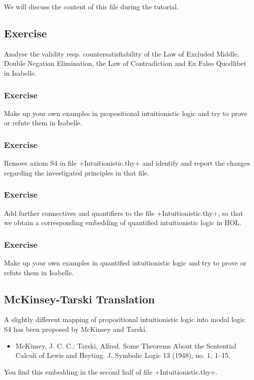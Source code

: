 \documentclass{article}
\begin{document}
We will discuss the content of this file during the tutorial.

\subsection{Exercise}
Analyse the validity resp. countersatisfiability of the Law of
Excluded Middle, Double Negation Elimination, the Law
of Contradiction and Ex Falso Quodlibet in Isabelle.

\subsubsection{Exercise}
Make up your own examples in propositional intuitionistic logic and try to prove or refute them in Isabelle.

\subsubsection{Exercise}
Remove axiom S4 in file +Intuitionistic.thy+ and identify and report
the changes regarding the investigated principles in that file.

\subsubsection{Exercise}
Add further connectives and quantifiers to the file
+Intuitionistic.thy+, so that we obtain a corresponding embedding of
quantified intuitionistic logic in HOL.

\subsubsection{Exercise}
Make up your own examples in quantified intuitionistic logic and try to prove or refute them in Isabelle.


\subsection{McKinsey-Tarski Translation}
A slightly different mapping of propositional intuitionistic logic
into modal logic S4 has been proposed by McKinsey and Tarski.
\begin{itemize}
\item McKinsey, J. C. C.; Tarski, Alfred. Some Theorems About the Sentential Calculi of Lewis and Heyting. J. Symbolic Logic 13 (1948), no. 1, 1--15.
\end{itemize}
You find this embedding in the second half of file
+Intuitionistic.thy+. 
\end{document}
